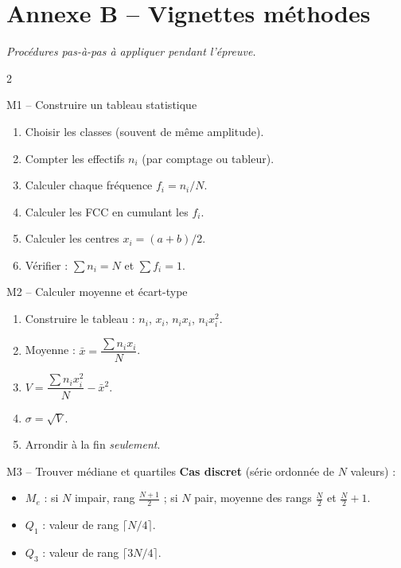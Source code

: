 \documentclass[11pt,a4paper]{article}
\begin{document}
\section*{\color{bioaccent}Annexe B -- Vignettes méthodes}
\emph{Procédures pas-à-pas à appliquer pendant l'épreuve.}

\vspace{0.3cm}

\begin{multicols}{2}

\begin{vignetteMethode}{M1 -- Construire un tableau statistique}
\begin{enumerate}[leftmargin=*,itemsep=1pt]
  \item Choisir les classes (souvent de même amplitude).
  \item Compter les effectifs $n_i$ (par comptage ou tableur).
  \item Calculer chaque fréquence $f_i = n_i/N$.
  \item Calculer les FCC en cumulant les $f_i$.
  \item Calculer les centres $x_i = (a+b)/2$.
  \item Vérifier : $\sum n_i = N$ et $\sum f_i = 1$.
\end{enumerate}
\end{vignetteMethode}

\begin{vignetteMethode}{M2 -- Calculer moyenne et écart-type}
\begin{enumerate}[leftmargin=*,itemsep=1pt]
  \item Construire le tableau : $n_i$, $x_i$, $n_i x_i$, $n_i x_i^2$.
  \item Moyenne : $\bar{x} = \dfrac{\sum n_i x_i}{N}$.
  \item $V = \dfrac{\sum n_i x_i^2}{N} - \bar{x}^2$.
  \item $\sigma = \sqrt{V}$.
  \item Arrondir à la fin \emph{seulement}.
\end{enumerate}
\end{vignetteMethode}

\begin{vignetteMethode}{M3 -- Trouver médiane et quartiles}
\textbf{Cas discret} (série ordonnée de $N$ valeurs) :
\begin{itemize}[leftmargin=*,itemsep=1pt]
  \item $M_e$ : si $N$ impair, rang $\frac{N+1}{2}$ ; si $N$ pair, moyenne des rangs $\frac{N}{2}$ et $\frac{N}{2}+1$.
  \item $Q_1$ : valeur de rang $\lceil N/4 \rceil$.
  \item $Q_3$ : valeur de rang $\lceil 3N/4 \rceil$.
\end{itemize}


\end{vignetteMethode}
\end{multicols}
\end{document}
